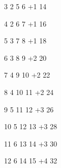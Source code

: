        3           2           5               6              +1                      14 

       4           2           6               7              +1                      16 

       5           3           7               8              +1                      18 

       6           3           8               9              +2                      20 

       7           4           9               10             +2                      22 

       8           4          10               11             +2                      24 

       9           5          11               12             +3                      26 

       10          5          12               13             +3                      28 

       11          6          13               14             +3                      30 

       12          6          14               15             +4                      32 

                                                                                                       
 